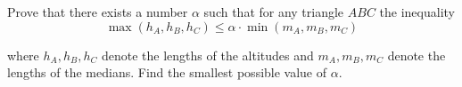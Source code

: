 Prove that there exists a number $\alpha$ such that for any triangle $ABC$ the inequality\[ \max(h_A,h_B,h_C)\le \alpha\cdot\min(m_A,m_B,m_C)\]

where $h_A,h_B,h_C$ denote the lengths of the altitudes and $m_A,m_B,m_C$ denote the lengths of the medians. Find the smallest possible value of $\alpha$.